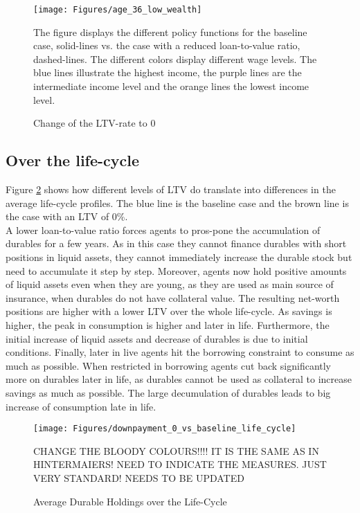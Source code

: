 \documentclass[12pt,a4paper,leqno]{article}
\theoremstyle{definition}
\begin{document}
\begin{figure}[!htbp]
\caption{Change of the LTV-rate to $0$} 
\label{policy_downpayment0_age36}	%
\centering
\texttt{[image: Figures/age\_36\_low\_wealth]}  %

\begin{minipage}{0.8\linewidth}
\footnotesize{The figure displays the different policy functions for the baseline case, solid-lines vs. the case with a reduced loan-to-value ratio, dashed-lines. The different colors display different wage levels. The blue lines illustrate the highest income, the purple lines are the intermediate income level and the orange lines the lowest income level.}
\end{minipage}

\end{figure}

\subsection{Over the life-cycle}
Figure \ref{downpayment_vs_baseline_lc} shows how different levels of LTV do translate into differences in the average life-cycle profiles. The blue line is the baseline case and the brown line is the case with an LTV of 0\%. \\ A lower loan-to-value ratio forces agents to  pros-pone the accumulation of durables for a few years. As in this case they cannot finance durables with short positions in liquid assets, they cannot immediately increase the durable stock but need to accumulate it step by step. Moreover, agents now hold positive amounts of liquid assets even when they are young, as they are used as main source of insurance, when durables do not have collateral value. The resulting net-worth positions are higher with a lower LTV over the whole life-cycle. As savings is higher, the peak in consumption is higher and later in life.
Furthermore, the initial increase of liquid assets and decrease of durables is due to initial conditions. Finally, later in live agents hit the borrowing constraint to consume as much as possible. When restricted in borrowing agents cut back significantly more on durables later in life, as durables cannot be used as collateral to increase savings as much as possible. The large decumulation of durables leads to big increase of consumption late in life. 


\begin{figure}[!htbp]
\caption{Average Durable Holdings over the Life-Cycle} 
\label{downpayment_vs_baseline_lc}	%
\centering
\texttt{[image: Figures/downpayment\_0\_vs\_baseline\_life\_cycle]}  %

\begin{minipage}{0.8\linewidth}
\footnotesize{CHANGE THE BLOODY COLOURS!!!! IT IS THE SAME AS IN HINTERMAIERS! NEED TO INDICATE THE MEASURES. JUST VERY STANDARD! NEEDS TO BE UPDATED}
\end{minipage}

\end{figure}
\end{document}
